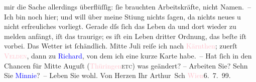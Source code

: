                     mir die Sache allerdings überflüſſig: ſie brauchten Arbeitskräfte, nicht
                    Namen. –\pend
           \pstart
           Ich bin noch hier; und will über meine {\pb}Sti{\geminationm}ung nichts ſagen, da nichts neues u nicht
                    erfreuliches vorliegt. Gerade dſs ſich das Leben da und dort wieder zu melden
                    anfängt, iſt das traurige; es iſt ein Leben dritter Ordnung, das beſte iſt
                    vorbei.\pend
           \pstart
           Das Wetter ist ſchändlich. Mitte Juli reiſe ich nach \textcolor{pink}{Kärnthen}{}\ledrightnote{\textcolor{pink}{Kärnten}}; zuerſt \textcolor{pink}{\textsc{Velden}}{}\ledrightnote{\textcolor{pink}{Velden}}, dann zu \textcolor{blue}{Richard}{}\ledrightnote{\textcolor{blue}{Richard Beer-Hofmann}}, von dem ich eine
                    kurze Karte habe. – Hat ſich in den Chancen für Mitte Auguſt (\textcolor{pink}{Thü{\pb}ringen}{}\ledrightnote{\textcolor{pink}{Thüringen}}{ }\textsc{etc}) was geändert? – Arbeiten Sie? Sehn Sie \textcolor{blue}{Minnie}{}\ledrightnote{\textcolor{blue}{Hermine von Schaffgotsch}}? –\pend
           \pstart Leben Sie wohl. Von Herzen Ihr \spacefill\mbox{Arthur Sch}\pend{}\pstart
           \textcolor{pink}{Wien}{}\ledrightnote{\textcolor{pink}{Wien}}{ }6. 7. 99.\pend
           \endnumbering{}  
      